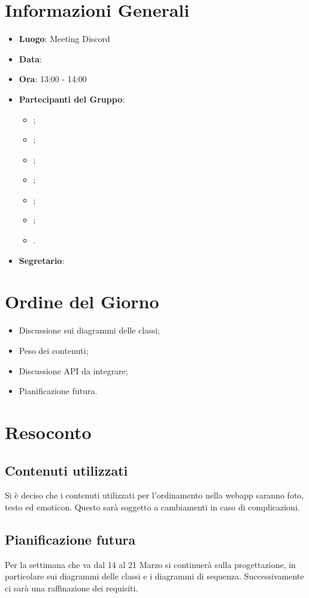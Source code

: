 \section{Informazioni Generali}

\begin{itemize}
	\item{\textbf{Luogo}}: Meeting Discord
	\item{\textbf{Data}}: \D
	\item{\textbf{Ora}}: 13:00 - 14:00
	\item{\textbf{Partecipanti del Gruppo}}:
	\begin{itemize}
		\item{\EP{};}
		\item{\FP{};}
		\item{\GC{};}
		\item{\LW{};}
		\item{\MB{};}
		\item{\MG{};}
		\item{\PV{}.}
	\end{itemize}
	\item{\textbf{Segretario}}: \PV{}
\end{itemize}

\section{Ordine del Giorno}
\begin{itemize}
	\item{Discussione sui diagrammi delle classi;}
	\item{Peso dei contenuti;}
	\item{Discussione API da integrare;}
	\item{Pianificazione futura.}
\end{itemize}

\section{Resoconto}

\subsection{Contenuti utilizzati}
Si è deciso che i contenuti utilizzati per l'ordinamento nella webapp saranno foto, testo ed emoticon. Questo sarà soggetto a cambiamenti in caso di complicazioni.



\subsection{Pianificazione futura}
Per la settimana che va dal 14 al 21 Marzo si continuerà sulla progettazione, in particolare sui diagrammi delle classi e i diagrammi di sequenza.
Successivamente ci sarà una raffinazione dei requisiti.